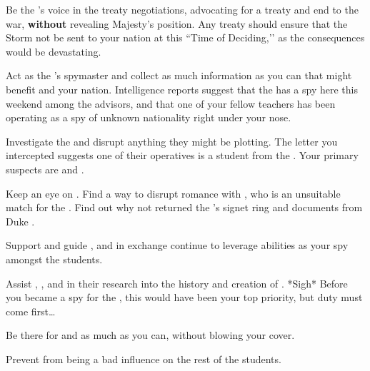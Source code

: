 \documentclass[char]{GL2020}
\begin{document}
\begin{itemz}
    \item Be the \cQueen{\Monarch}'s voice in the treaty negotiations, advocating for a treaty and end to the war, \textbf{without} revealing \cQueen{\Their} Majesty's position. Any treaty should ensure that the Storm not be sent to your nation at this ``Time of Deciding,’’ as the consequences would be devastating.
    \item Act as the \cQueen{\Monarch}'s spymaster and collect as much information as you can that might benefit \cQueen{\them} and your nation. Intelligence reports suggest that the \pTech{} has a spy here this weekend among the advisors, and that one of your fellow teachers has been operating as a spy of unknown nationality right under your nose.
    \item Investigate the \pGoaties{} and disrupt anything they might be plotting. The letter you intercepted suggests one of their operatives is a student from the \pFarm{}. Your primary suspects are \cDisney{} and \cAdopted{}.
    \item Keep an eye on \cPrince{}. Find a way to disrupt \cPrince{\their} romance with \cPirate{}, who is an unsuitable match for the \cPrince{\heir}. Find out why \cPrince{\theyhave} not returned the \cQueen{\Monarch}'s signet ring and documents from Duke \cChupStudent{\formal}.
\end{itemz}

\begin{itemz}
    \item Support and guide \cLibAssist{}, and in exchange continue to leverage \cLibAssist{\their} abilities as your spy amongst the students.
    \item Assist \cEbbPriest{}, \cHeadScientist{}, and \cScholarship{} in their research into the history and creation of \pEarth{}. *Sigh* Before you became a spy for the \cQueen{\Monarch}, this would have been your top priority, but duty must come first\ldots{}
    \item Be there for \cEthics{} and \cWildCard{} as much as you can, without blowing your cover.
    \item Prevent \cTechStar{} from being a bad influence on the rest of the students.
\end{itemz}
\end{document}
